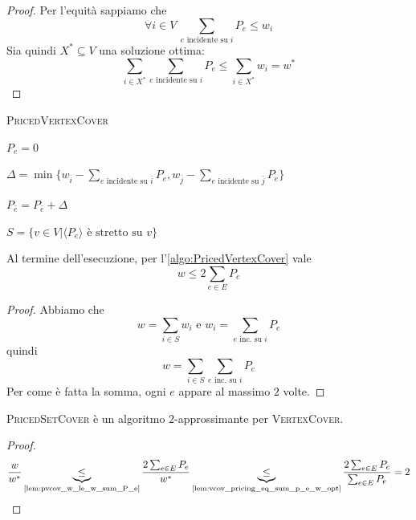 \begin{proof}
	Per l'equità sappiamo che
	$$
		\forall i \in V ~ \sum_{e \text{ incidente su } i} P_e \leq w_i
	$$
	Sia quindi $X^*\subseteq V$ una soluzione ottima:
	$$
		\sum_{i \in X^*} \sum_{e \text{ incidente su } i} P_e \leq \sum_{i \in X^*} w_i = w^*
	$$
\end{proof}
\begin{algorithm}
	\caption{\textsc{PricedVertexCover}}
	\label{algo:PricedVertexCover}

	{
		$P_e = 0$
	}

	{
		$\Delta = \min\{w_{\bar{i}} - \sum_{e \text{ incidente su } \bar{i}} P_e, w_{\bar{j}} - \sum_{e \text{ incidente su } \bar{j}} P_e\}$

		$P_{\bar{e}} = P_{\bar{e}} + \Delta$
	}

	$S = \{v \in V | \langle P_e \rangle \text{ è stretto su } v\}$

\end{algorithm}

\begin{lemma}\label{lem:pvcov_w_le_w_sum_P_e}
	Al termine dell'esecuzione, per l'\cref{algo:PricedVertexCover} vale
	$$
		w \leq 2 \sum_{e \in E} P_e
	$$
\end{lemma}
\begin{proof}
	Abbiamo che
	$$
		w = \sum_{i \in S} w_i \text { e } w_i = \sum_{e \text{ inc. su } i} P_e
	$$
	quindi
	$$
		w = \sum_{i \in S} \sum_{e \text{ inc. su } i} P_e
	$$
	Per come è fatta la somma, ogni $e$ appare al massimo $2$ volte.
\end{proof}

\begin{theorem}
	\textsc{PricedSetCover} è un algoritmo $2$-approssimante per \textsc{VertexCover}.
\end{theorem}

\begin{proof}
	$$
		\frac{w}{w^*} \underbrace{\leq}_\text{\cref{lem:pvcov_w_le_w_sum_P_e}}
		\frac{2\sum_{e \in E} P_e}{w^*}
		\underbrace{\leq}_\text{\cref{lem:vcov_pricing_eq_sum_p_e_w_opt}}
		\frac{2 \sum_{e \in E} P_e}{\sum_{e \in E} P_e} = 2
	$$
\end{proof}



